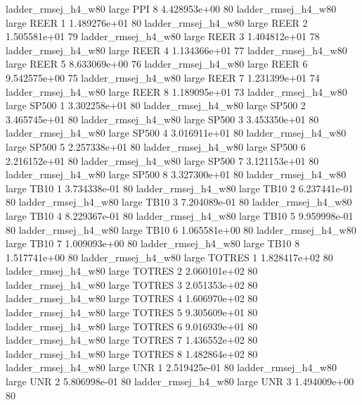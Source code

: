 ladder_rmsej_h4_w80      large      PPI                 8 4.428953e+00 80
ladder_rmsej_h4_w80      large     REER                 1 1.489276e+01 80
ladder_rmsej_h4_w80      large     REER                 2 1.505581e+01 79
ladder_rmsej_h4_w80      large     REER                 3 1.404812e+01 78
ladder_rmsej_h4_w80      large     REER                 4 1.134366e+01 77
ladder_rmsej_h4_w80      large     REER                 5 8.633069e+00 76
ladder_rmsej_h4_w80      large     REER                 6 9.542575e+00 75
ladder_rmsej_h4_w80      large     REER                 7 1.231399e+01 74
ladder_rmsej_h4_w80      large     REER                 8 1.189095e+01 73
ladder_rmsej_h4_w80      large    SP500                 1 3.302258e+01 80
ladder_rmsej_h4_w80      large    SP500                 2 3.465745e+01 80
ladder_rmsej_h4_w80      large    SP500                 3 3.453350e+01 80
ladder_rmsej_h4_w80      large    SP500                 4 3.016911e+01 80
ladder_rmsej_h4_w80      large    SP500                 5 2.257338e+01 80
ladder_rmsej_h4_w80      large    SP500                 6 2.216152e+01 80
ladder_rmsej_h4_w80      large    SP500                 7 3.121153e+01 80
ladder_rmsej_h4_w80      large    SP500                 8 3.327300e+01 80
ladder_rmsej_h4_w80      large     TB10                 1 3.734338e-01 80
ladder_rmsej_h4_w80      large     TB10                 2 6.237441e-01 80
ladder_rmsej_h4_w80      large     TB10                 3 7.204089e-01 80
ladder_rmsej_h4_w80      large     TB10                 4 8.229367e-01 80
ladder_rmsej_h4_w80      large     TB10                 5 9.959998e-01 80
ladder_rmsej_h4_w80      large     TB10                 6 1.065581e+00 80
ladder_rmsej_h4_w80      large     TB10                 7 1.009093e+00 80
ladder_rmsej_h4_w80      large     TB10                 8 1.517741e+00 80
ladder_rmsej_h4_w80      large   TOTRES                 1 1.828417e+02 80
ladder_rmsej_h4_w80      large   TOTRES                 2 2.060101e+02 80
ladder_rmsej_h4_w80      large   TOTRES                 3 2.051353e+02 80
ladder_rmsej_h4_w80      large   TOTRES                 4 1.606970e+02 80
ladder_rmsej_h4_w80      large   TOTRES                 5 9.305609e+01 80
ladder_rmsej_h4_w80      large   TOTRES                 6 9.016939e+01 80
ladder_rmsej_h4_w80      large   TOTRES                 7 1.436552e+02 80
ladder_rmsej_h4_w80      large   TOTRES                 8 1.482864e+02 80
ladder_rmsej_h4_w80      large      UNR                 1 2.519425e-01 80
ladder_rmsej_h4_w80      large      UNR                 2 5.806998e-01 80
ladder_rmsej_h4_w80      large      UNR                 3 1.494009e+00 80
